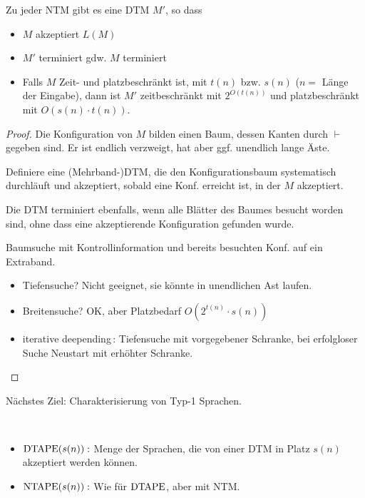 \begin{Satz}[name={[Zu jeder \acs*{NTM} gibt es \acs*{DTM}]}]\label{satz:6.1}
	Zu jeder \ac{NTM} gibt es eine \ac{DTM} $M'$, so dass
	\begin{itemize}
	\item $M$ akzeptiert $L(M)$
	\item $M'$ terminiert gdw. $M$ terminiert
	\item Falls $M$ Zeit- und platzbeschränkt ist, mit $t(n)$ bzw. $s(n)$ ($n=$ Länge der Eingabe), dann ist $M'$ zeitbeschränkt mit $2^{O(t(n))}$ und platzbeschränkt mit $O(s(n)\cdot t(n))$.
	\end{itemize}
\end{Satz}\vspace{-2em}
\begin{proof}
	Die Konfiguration von $M$ bilden einen Baum, dessen Kanten durch $\vdash$ gegeben sind. Er ist endlich verzweigt, hat aber ggf. unendlich lange Äste.
	
	Definiere eine (Mehrband-)\ac{DTM}, die den Konfigurationsbaum systematisch durchläuft und akzeptiert, sobald eine Konf. erreicht ist, in der $M$ akzeptiert.
	
	Die \ac{DTM} terminiert ebenfalls, wenn alle Blätter des Baumes besucht worden sind, ohne dass eine akzeptierende Konfiguration gefunden wurde.
	
	Baumsuche mit Kontrollinformation und bereits besuchten Konf. auf ein Extraband.
	\begin{itemize}
	\item Tiefensuche? Nicht geeignet, sie könnte in unendlichen Ast laufen.
	\item Breitensuche? OK, aber Platzbedarf $O(2^{t(n)}\cdot s(n))$
	\item iterative deepending\,: Tiefensuche mit vorgegebener Schranke, bei erfolgloser Suche Neustart mit erhöhter Schranke. \qedhere
	\end{itemize}
\end{proof}
Nächstes Ziel: Charakterisierung von Typ-1 Sprachen.
\begin{Def}[name={[$\DTAPE$ und $\NTAPE$]}]\
\begin{itemize}
\item $\operatorname{DTAPE}(s(n)):$ Menge der Sprachen, die von einer \ac{DTM} in Platz $s(n)$ akzeptiert werden können.
\item $\operatorname{NTAPE}(s(n)):$ Wie für $\DTAPE$, aber mit \ac{NTM}. \qedhere
\end{itemize}
\end{Def}
